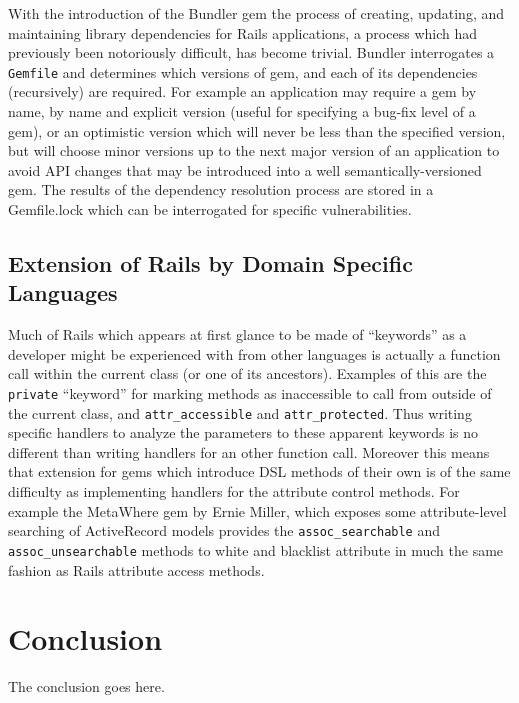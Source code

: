 \documentclass[conference]{IEEEtran}
\begin{document}
With the introduction of the Bundler gem the process of creating, updating, and
maintaining library dependencies for Rails applications, a process which had
previously been notoriously difficult, has become trivial.  Bundler interrogates
a \texttt{Gemfile} and determines which versions of gem, and each of its
dependencies (recursively) are required.  For example an application may require
a gem by name, by name and explicit version (useful for specifying a bug-fix
level of a gem), or an optimistic version which will never be less than the
specified version, but will choose minor versions up to the next major version
of an application to avoid API changes that may be introduced into a well
semantically-versioned gem.  The results of the dependency resolution process
are stored in a Gemfile.lock which can be interrogated for specific
vulnerabilities.

\subsection{Extension of Rails by Domain Specific Languages}

Much of Rails which appears at first glance to be made of ``keywords'' as a
developer might be experienced with from other languages is actually a function
call within the current class (or one of its ancestors).  Examples of this are
the \texttt{private}\cite{private_method} ``keyword'' for marking methods as inaccessible to call
from outside of the current class, and \texttt{attr\_accessible} and
\texttt{attr\_protected}.  Thus writing specific handlers to analyze the
parameters to these apparent keywords is no different than writing handlers for
an other function call.  Moreover this means that extension for gems which
introduce DSL methods of their own is of the same difficulty as implementing
handlers for the attribute control methods.  For example the MetaWhere gem by
Ernie Miller, which exposes some attribute-level searching of ActiveRecord
models provides the \texttt{assoc\_searchable} and \texttt{assoc\_unsearchable}
methods to white and blacklist attribute in much the same fashion as Rails
attribute access methods.

\section{Conclusion}
The conclusion goes here.




\end{document}
